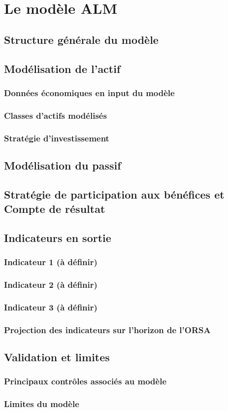 \chapter{Le modèle ALM}
\label{chap:model_alm}
\section{Structure générale du modèle}
\section{ Modélisation de l’actif}
\subsection{ Données économiques en input du modèle}
\subsection{Classes d'actifs modélisés}
\subsection{Stratégie d'investissement}

\section{Modélisation du passif}

\section{Stratégie de participation aux bénéfices et Compte de résultat}

\section{Indicateurs en sortie}
\subsection{Indicateur 1 (à définir)}
\subsection{Indicateur 2 (à définir)}
\subsection{Indicateur 3 (à définir)}
\subsection{Projection des indicateurs sur l’horizon de l’ORSA}

\section{Validation et limites}
\subsection{Principaux contrôles associés au modèle}
\subsection{Limites du modèle}


